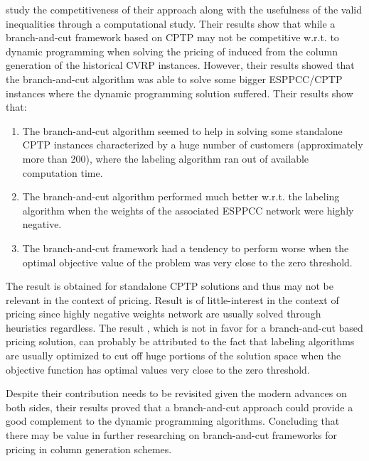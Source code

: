 \textcite{jepsen2014} study the competitiveness of their approach
along with the usefulness of the valid inequalities through a computational study.
Their results show that while a branch-and-cut framework based on CPTP may
not be competitive w.r.t. to dynamic programming
when solving the pricing of induced from the column generation
of the historical CVRP instances.
However, their results showed that the branch-and-cut algorithm
was able to solve some bigger ESPPCC/CPTP instances where the
dynamic programming solution suffered.
Their results show that:
\begin{enumerate}
	\setlength{\itemsep}{0pt}
	\setlength{\parskip}{0pt}

	\item \label{itm:cptp-branch-and-cut-better-p1} The branch-and-cut
	      algorithm seemed to help in solving some standalone CPTP instances characterized
	      by a huge number of customers (approximately more than 200),
	      where the labeling algorithm ran out of available computation time.
	\item \label{itm:cptp-branch-and-cut-better-p2} The branch-and-cut algorithm
	      performed much better w.r.t. the labeling algorithm when the
	      weights of the associated ESPPCC network were highly negative.
	\item \label{itm:cptp-branch-and-cut-better-p3} The branch-and-cut framework had a tendency
	      to perform worse when the optimal objective value of the problem was very close to the zero
	      threshold.
\end{enumerate}
The result  is obtained for standalone
CPTP solutions and thus may not be relevant in the context of pricing.
Result  is of little-interest
in the context of pricing
since highly negative weights network are usually solved through heuristics regardless.
The result , which is not in favor for a
branch-and-cut based pricing solution,
can probably be attributed to the fact that labeling algorithms
are usually optimized to cut off huge portions of the solution space when
the objective function has optimal values very close to the zero threshold.

Despite their contribution
needs to be revisited given the modern
advances on both sides,
their results proved that a branch-and-cut approach could provide a good complement
to the dynamic programming algorithms.
Concluding that there may be value in further researching
on branch-and-cut frameworks for pricing in column generation schemes.


